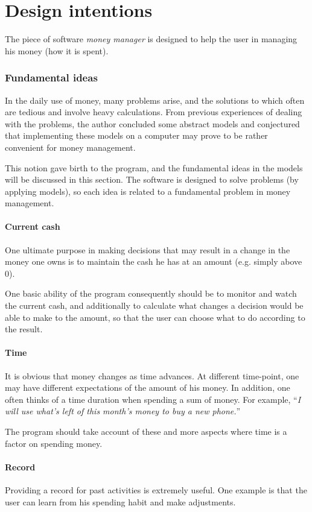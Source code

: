 \part{Design intentions}
The piece of software \emph{money manager} is designed to help the user in managing his money (how it is spent).

\section{Fundamental ideas}
In the daily use of money, many problems arise, and the solutions to which often are tedious and involve heavy calculations. From previous experiences of dealing with the problems, the author concluded some abstract models and conjectured that implementing these models on a computer may prove to be rather convenient for money management. 

This notion gave birth to the program, and the fundamental ideas in the models will be discussed in this section. The software is designed to solve problems (by applying models), so each idea is related to a fundamental problem in money management.

\subsection{Current cash}
One ultimate purpose in making decisions that may result in a change in the money one owns is to maintain the cash he has at an amount (e.g. simply above 0).

One basic ability of the program consequently should be to monitor and watch the current cash, and additionally to calculate what changes a decision would be able to make to the amount, so that the user can choose what to do according to the result.

\subsection{Time}
It is obvious that money changes as time advances. At different time-point, one may have different expectations of the amount of his money. In addition, one often thinks of a time duration when spending a sum of money. For example, ``\emph{I will use what's left of this month's money to buy a new phone.}''

The program should take account of these and more aspects where time is a factor on spending money.

\subsection{Record}
Providing a record for past activities is extremely useful. One example is that the user can learn from his spending habit and make adjustments.

